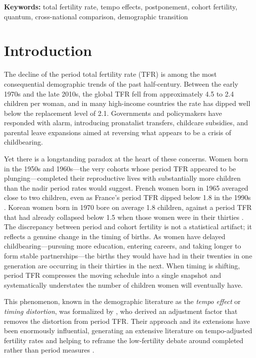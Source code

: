 \documentclass[12pt]{article}
\begin{document}
\bigskip
\noindent\textbf{Keywords:} total fertility rate, tempo effects, postponement,
cohort fertility, quantum, cross-national comparison, demographic transition

\clearpage

\section{Introduction}

The decline of the period total fertility rate (TFR) is among the most
consequential demographic trends of the past half-century.  Between the
early 1970s and the late 2010s, the global TFR fell from approximately
4.5 to 2.4 children per woman, and in many high-income countries the
rate has dipped well below the replacement level of 2.1.  Governments
and policymakers have responded with alarm, introducing pronatalist
transfers, childcare subsidies, and parental leave expansions aimed at
reversing what appears to be a crisis of childbearing.

Yet there is a longstanding paradox at the heart of these concerns.
Women born in the 1950s and 1960s---the very cohorts whose period TFR
appeared to be plunging---completed their reproductive lives with
substantially more children than the nadir period rates would suggest.
French women born in 1965 averaged close to two children, even as
France's period TFR dipped below 1.8 in the 1990s
\citep{Sobotka2011}.  Korean women born in 1970 bore on average 1.8
children, against a period TFR that had already collapsed below 1.5
when those women were in their thirties \citep{Kohler2002}.  The
discrepancy between period and cohort fertility is not a statistical
artifact; it reflects a genuine change in the timing of births.  As
women have delayed childbearing---pursuing more education, entering
careers, and taking longer to form stable partnerships---the births they
would have had in their twenties in one generation are occurring in
their thirties in the next.  When timing is shifting, period TFR
compresses the moving schedule into a single snapshot and
systematically understates the number of children women will eventually
have.

This phenomenon, known in the demographic literature as the
\emph{tempo effect} or \emph{timing distortion}, was formalized by
\citet{BongaartsFeeney1998}, who derived an adjustment factor that
removes the distortion from period TFR.  Their approach and its
extensions have been enormously influential, generating an extensive
literature on tempo-adjusted fertility rates and helping to reframe
the low-fertility debate around completed rather than period measures
\citep{KohlerOrtega2002,Sobotka2004,Bongaarts2009,BongaartsSobotka2012}.
\end{document}
